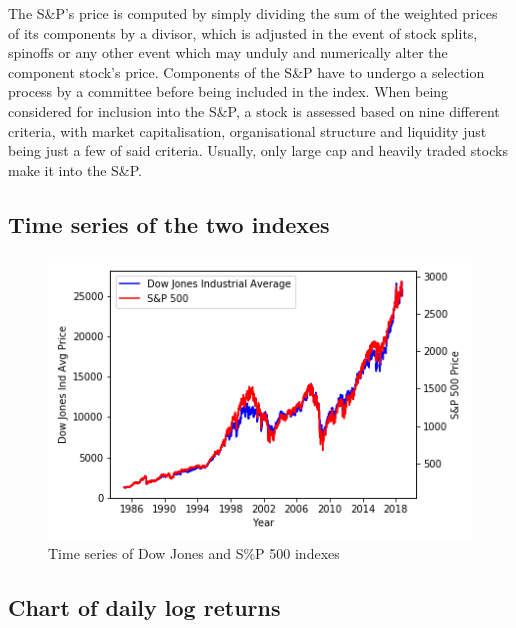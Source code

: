\documentclass[a4paper]{article}
\begin{document}
The S\&P’s price is computed by simply dividing the sum of the weighted prices of its components by a divisor, which is adjusted in the event of stock splits, spinoffs or any other event which may unduly and numerically alter the component stock’s price. Components of the S\&P have to undergo a selection process by a committee before being included in the index.  When being considered for inclusion into the S\&P, a stock is assessed based on nine different criteria, with market capitalisation, organisational structure and liquidity just being just a few of said criteria. Usually, only large cap and heavily traded stocks make it into the S\&P.

\subsection{Time series of the two indexes}

\begin{figure}[h]
	\includegraphics[width=\linewidth]{time_series.png}
	\caption{Time series of Dow Jones and S\%P 500 indexes}
\end{figure}

\newpage
\subsection{Chart of daily log returns}
\end{document}
